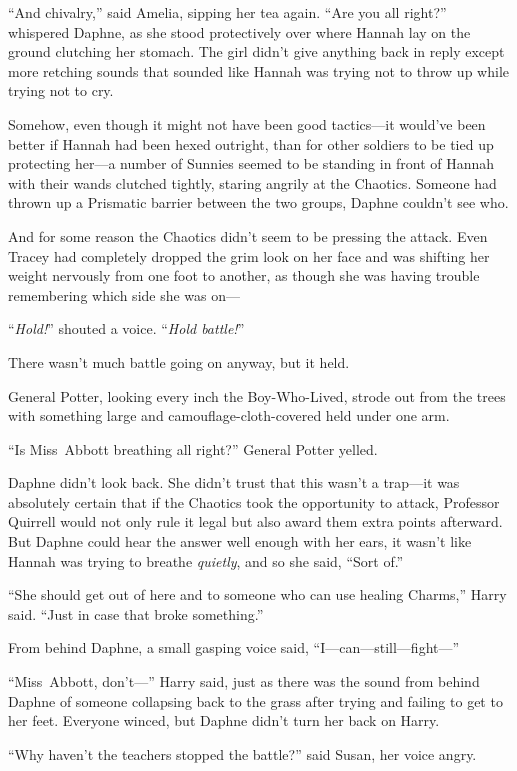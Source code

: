 “And chivalry,” said Amelia, sipping her tea again.
\later
“Are you all right?” whispered Daphne, as she stood protectively over where
Hannah lay on the ground clutching her stomach. The girl didn’t give anything
back in reply except more retching sounds that sounded like Hannah was trying
not to throw up while trying not to cry.

Somehow, even though it might not have been good tactics—it would’ve been
better if Hannah had been hexed outright, than for other soldiers to be tied up
protecting her—a number of Sunnies seemed to be standing in front of Hannah
with their wands clutched tightly, staring angrily at the Chaotics. Someone had
thrown up a Prismatic barrier between the two groups, Daphne couldn’t see who.

And for some reason the Chaotics didn’t seem to be pressing the attack. Even
Tracey had completely dropped the grim look on her face and was shifting her
weight nervously from one foot to another, as though she was having trouble
remembering which side she was on—

“\emph{Hold!}” shouted a voice. “\emph{Hold battle!}”

There wasn’t much battle going on anyway, but it held.

General Potter, looking every inch the Boy-Who-Lived, strode out from the trees
with something large and camouflage-cloth-covered held under one arm.

“Is Miss~Abbott breathing all right?” General Potter yelled.

Daphne didn’t look back. She didn’t trust that this wasn’t a trap—it was
absolutely certain that if the Chaotics took the opportunity to attack,
Professor Quirrell would not only rule it legal but also award them extra
points afterward. But Daphne could hear the answer well enough with her ears,
it wasn’t like Hannah was trying to breathe \emph{quietly}, and so she said,
“Sort of.”

“She should get out of here and to someone who can use healing Charms,” Harry
said. “Just in case that broke something.”

From behind Daphne, a small gasping voice said, “I—can—still—fight—”

“Miss~Abbott, don’t—” Harry said, just as there was the sound from behind
Daphne of someone collapsing back to the grass after trying and failing to get
to her feet. Everyone winced, but Daphne didn’t turn her back on Harry.

“Why haven’t the teachers stopped the battle?” said Susan, her voice angry.

